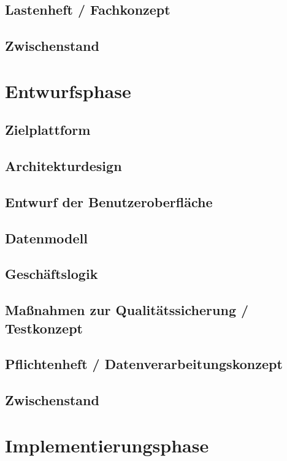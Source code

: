 \documentclass[12pt, xcolor=dvipsnames]{scrartcl}
\begin{document}
\subsection{Lastenheft / Fachkonzept}

\subsection{Zwischenstand}

\section{Entwurfsphase}

\subsection{Zielplattform}

\subsection{Architekturdesign}

\subsection{Entwurf der Benutzeroberfläche}

\subsection{Datenmodell}

\subsection{Geschäftslogik}

\subsection{Maßnahmen zur Qualitätssicherung / Testkonzept}

\subsection{Pflichtenheft / Datenverarbeitungskonzept}

\subsection{Zwischenstand}

\section{Implementierungsphase}
\end{document}
